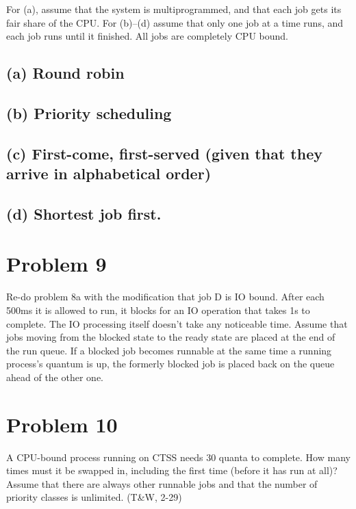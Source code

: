 \documentclass[11pt]{article}
\begin{document}
For (a), assume that the system is multiprogrammed, and that each job gets its fair share of the CPU. For (b)–(d) assume that only one job at a time runs, and each job runs until it finished. All jobs are completely CPU bound.

\subsection*{(a) Round robin}


\subsection*{(b) Priority scheduling}


\subsection*{(c) First-come, first-served (given that they arrive in alphabetical order)}


\subsection*{(d) Shortest job first.}


\section*{Problem 9}
Re-do problem 8a with the modification that job D is IO bound. After each 500ms it is allowed to run, it blocks for an IO operation that takes 1s to complete. The IO processing itself doesn’t take any noticeable time. Assume that jobs moving from the blocked state to the ready state are placed at the end of the run queue. If a blocked job becomes runnable at the same time a running process’s quantum is up, the formerly blocked job is placed back on the queue ahead of the other one.



\section*{Problem 10}
A CPU-bound process running on CTSS needs 30 quanta to complete. How many times must it be swapped in, including the first time (before it has run at all)? Assume that there are always other runnable jobs and that the number of priority classes is unlimited. (T\&W, 2-29)
\end{document}
